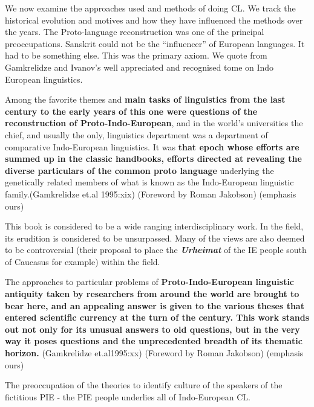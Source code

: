 We now examine the approaches used and methods of doing CL. We track the historical evolution and motives and how they have influenced the methods over the years. The Proto-language reconstruction was one of the principal preoccupations. Sanskrit could not be the “influencer” of European languages. It had to be something else. This was the primary axiom. We quote from Gamkrelidze and Ivanov’s well appreciated and recognised tome on Indo European linguistics.

\begin{myquote}
Among the favorite themes and \textbf{main tasks of linguistics from the last century to the early years of this one were questions of the reconstruction of Proto-Indo-European}, and in the world's universities the chief, and usually the only, linguistics department was a department of comparative Indo-European linguistics. It was \textbf{that epoch whose efforts are summed up in the classic handbooks, efforts directed at revealing the diverse particulars of the common proto language} underlying the genetically related members of what is known as the Indo-European linguistic family.(Gamkrelidze et.al 1995:xix) (Foreword by Roman Jakobson) (emphasis ours)
\end{myquote}

This book is considered to be a wide ranging interdisciplinary work. In the field, its erudition is considered to be unsurpassed. Many of the views are also deemed to be controversial (their proposal to place the \textbf{\textit{Urheimat}} of the IE people south of Caucasus for example) within the field.

\begin{myquote}
The approaches to particular problems of \textbf{Proto-Indo-European linguistic antiquity taken by researchers from around the world are brought to bear here, and an appealing answer is given to the various theses that entered scientific currency at the turn of the century. This work stands out not only for its unusual answers to old questions, but in the very way it poses questions and the unprecedented breadth of its thematic horizon.} (Gamkrelidze et.al1995:xx) (Foreword by Roman Jakobson) (emphasis ours)
\end{myquote}

The preoccupation of the theories to identify culture of the speakers of the fictitious PIE - the PIE people underlies all of Indo-European CL.

